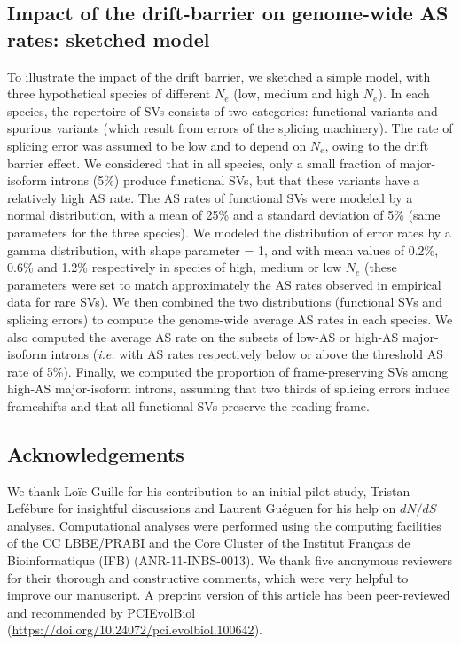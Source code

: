 \subsection{Impact of the drift-barrier on genome-wide AS rates: sketched model}
To illustrate the impact of the drift barrier, we sketched a simple model, with three hypothetical species of different $N_e$ (low, medium and high $N_e$). In each species, the repertoire of \acrshort{SV}s consists of two categories: functional variants and spurious variants (which result from errors of the splicing machinery). The rate of splicing error was assumed to be low and to depend on $N_e$, owing to the drift barrier effect. We considered that in all species, only a small fraction of major-isoform introns (5\%) produce functional \acrshort{SV}s, but that these variants have a relatively high AS rate. The AS rates of functional \acrshort{SV}s were modeled by a normal distribution, with a mean of 25\% and a standard deviation of 5\% (same parameters for the three species). We modeled the distribution of error rates by a gamma distribution, with shape parameter = 1, and with mean values of 0.2\%, 0.6\% and 1.2\% respectively in species of high, medium or low $N_e$ (these parameters were set to match approximately the AS rates observed in empirical data for rare \acrshort{SV}s). We then combined the two distributions (functional \acrshort{SV}s and splicing errors) to compute the genome-wide average AS rates in each species. We also computed the average AS rate on the subsets of low-AS or high-AS major-isoform introns (\textit{i.e.} with AS rates respectively below or above the threshold AS rate of 5\%). Finally, we computed the proportion of frame-preserving \acrshort{SV}s among high-AS major-isoform introns, assuming that two thirds of splicing errors induce frameshifts and that all functional \acrshort{SV}s preserve the reading frame. 


\subsection*{Acknowledgements}
We thank Loïc Guille for his contribution to an initial pilot study, Tristan Lefébure for insightful discussions and Laurent Guéguen for his help on ${dN}/{dS}$ analyses. 
Computational analyses were performed using the computing facilities of the CC LBBE/PRABI and the Core Cluster of the Institut Français de Bioinformatique (IFB) (ANR-11-INBS-0013). We thank five anonymous reviewers for their thorough and constructive comments, which were very helpful to improve our manuscript. A preprint version of this article has been peer-reviewed and recommended by PCIEvolBiol (\url{https://doi.org/10.24072/pci.evolbiol.100642}).

